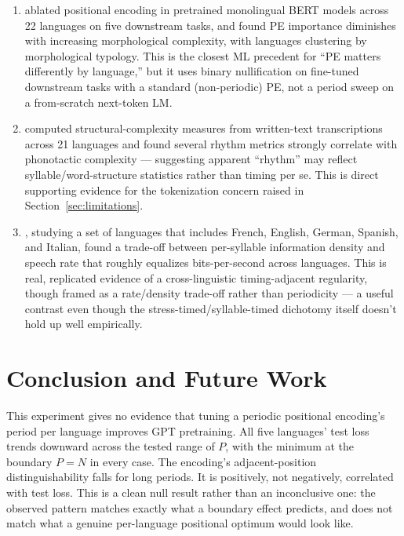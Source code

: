 \documentclass[11pt]{article}
\begin{document}
\begin{enumerate}
  \item \citet{ghosh2024morphology} ablated positional encoding in pretrained monolingual BERT models across 22 languages on five downstream tasks, and found PE importance diminishes with increasing morphological complexity, with languages clustering by morphological typology. This is the closest ML precedent for ``PE matters differently by language,'' but it uses binary nullification on fine-tuned downstream tasks with a standard (non-periodic) PE, not a period sweep on a from-scratch next-token LM.
  \item \citet{stojanovic2013crosslinguistic} computed structural-complexity measures from written-text transcriptions across 21 languages and found several rhythm metrics strongly correlate with phonotactic complexity --- suggesting apparent ``rhythm'' may reflect syllable/word-structure statistics rather than timing per se. This is direct supporting evidence for the tokenization concern raised in Section~\ref{sec:limitations}.
  \item \citet{pellegrino2011crosslanguage}, studying a set of languages that includes French, English, German, Spanish, and Italian, found a trade-off between per-syllable information density and speech rate that roughly equalizes bits-per-second across languages. This is real, replicated evidence of a cross-linguistic timing-adjacent regularity, though framed as a rate/density trade-off rather than periodicity --- a useful contrast even though the stress-timed/syllable-timed dichotomy itself doesn't hold up well empirically.
\end{enumerate}

\section{Conclusion and Future Work}

This experiment gives no evidence that tuning a periodic positional encoding's period per language improves GPT pretraining. All five languages' test loss trends downward across the tested range of $P$, with the minimum at the boundary $P = N$ in every case. The encoding's adjacent-position distinguishability falls for long periods. It is positively, not negatively, correlated with test loss. This is a clean null result rather than an inconclusive one: the observed pattern matches exactly what a boundary effect predicts, and does not match what a genuine per-language positional optimum would look like.
\end{document}
